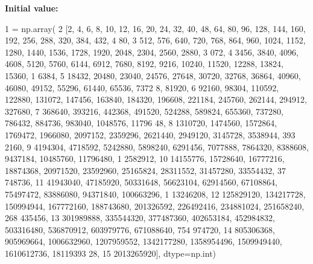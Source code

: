 {\bfseries Initial value\+:}
\begin{DoxyCode}
1 =  np.array(
2     [2, 4, 6, 8, 10, 12, 16, 20, 24, 32, 40, 48, 64, 80, 96, 128, 144, 160, 192, 256, 288, 320, 384, 432, 4
      80,
3      512, 576, 640, 720, 768, 864, 960, 1024, 1152, 1280, 1440, 1536, 1728, 1920, 2048, 2304, 2560, 2880, 3
      072,
4      3456, 3840, 4096, 4608, 5120, 5760, 6144, 6912, 7680, 8192, 9216, 10240, 11520, 12288, 13824, 15360, 1
      6384,
5      18432, 20480, 23040, 24576, 27648, 30720, 32768, 36864, 40960, 46080, 49152, 55296, 61440, 65536, 7372
      8, 81920,
6      92160, 98304, 110592, 122880, 131072, 147456, 163840, 184320, 196608, 221184, 245760, 262144, 294912, 
      327680,
7      368640, 393216, 442368, 491520, 524288, 589824, 655360, 737280, 786432, 884736, 983040, 1048576, 11796
      48,
8      1310720, 1474560, 1572864, 1769472, 1966080, 2097152, 2359296, 2621440, 2949120, 3145728, 3538944, 393
      2160,
9      4194304, 4718592, 5242880, 5898240, 6291456, 7077888, 7864320, 8388608, 9437184, 10485760, 11796480, 1
      2582912,
10      14155776, 15728640, 16777216, 18874368, 20971520, 23592960, 25165824, 28311552, 31457280, 33554432, 37
      748736,
11      41943040, 47185920, 50331648, 56623104, 62914560, 67108864, 75497472, 83886080, 94371840, 100663296, 1
      13246208,
12      125829120, 134217728, 150994944, 167772160, 188743680, 201326592, 226492416, 234881024, 251658240, 268
      435456,
13      301989888, 335544320, 377487360, 402653184, 452984832, 503316480, 536870912, 603979776, 671088640, 754
      974720,
14      805306368, 905969664, 1006632960, 1207959552, 1342177280, 1358954496, 1509949440, 1610612736, 18119393
      28,
15      2013265920], dtype=np.int)
\end{DoxyCode}
